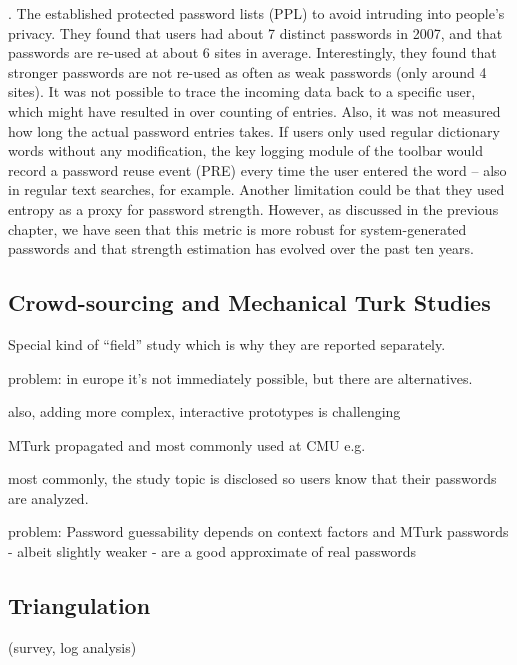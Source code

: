 \cite{Florencio2007LargeScaleStudyPasswordHabits}. The established protected password lists (PPL) to avoid intruding into people's privacy. They found that users had about 7 distinct passwords in 2007, and that passwords are re-used at about 6 sites in average. Interestingly, they found that stronger passwords are not re-used as often as weak passwords (only around 4 sites). It was not possible to trace the incoming data back to a specific user, which might have resulted in over counting of entries. Also, it was not measured how long the actual password entries takes. If users only used regular dictionary words without any modification, the key logging module of the toolbar would record a password reuse event (PRE) every time the user entered the word -- also in regular text searches, for example. Another limitation could be that they used entropy as a proxy for password strength. However, as discussed in the previous chapter, we have seen that this metric is more robust for system-generated passwords and that strength estimation has evolved over the past ten years. 

\subsection{Crowd-sourcing and Mechanical Turk Studies}
Special kind of ``field'' study which is why they are reported separately.

problem: in europe it's not immediately possible, but there are alternatives. 

also, adding more complex, interactive prototypes is challenging

\cite{Peer2017BeyondTheTurk}
\cite{Ross2010WhoAreTurkers}

MTurk
propagated and most commonly used at CMU e.g. \cite{Mazurek2013Measuring} \cite{Shay2014CanLongPasswordsBeSecureAndUsable} \cite{Shay2016DesigningPasswordPolicies}
\cite{Shay2015UsablePoliciesMTurk}
\cite{Ur2016PerceptionsPassword} \cite{Melicher2016UsabilityMobileTextPasswords} \cite{Ur2017DataDrivenPWMeter}

most commonly, the study topic is disclosed so users know that their passwords are analyzed. 

\cite{Huha2015UserReplaceablePasswords}

problem:
Password guessability depends on context factors and MTurk passwords - albeit slightly weaker - are a good approximate of real passwords \cite{Mazurek2013Measuring}


\subsection{Triangulation}
(survey, log analysis) \cite{Wash2016UnderstandingPasswordChoices}


